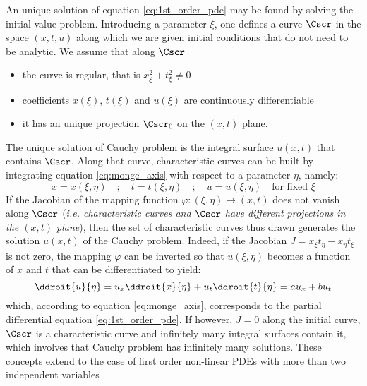 An unique solution of equation \eqref{eq:1st_order_pde} may be found by solving the initial value problem. Introducing a parameter $\xi$, one defines a curve $\Cscr$ in the space $(x,t,u)$ along which we are given initial conditions that do not need to be analytic. We assume that along $\Cscr$
\begin{itemize}
\item the curve is regular, that is $x_\xi^2 + t_\xi^2 \neq 0$
\item coefficients $x(\xi)$, $t(\xi)$ and $u(\xi)$ are continuously differentiable
\item it has an unique projection $\Cscr_0$ on the $(x,t)$ plane.
\end{itemize}
The unique solution of Cauchy problem is the integral surface $u(x,t)$ that contains $\Cscr$.
Along that curve, characteristic curves can be built by integrating equation \eqref{eq:monge_axis} with respect to a parameter $\eta$, namely:
\begin{equation}
  \label{eq:charac_on_C}
  x=x(\xi,\eta) \quad ; \quad t=t(\xi,\eta) \quad ; \quad u=u(\xi,\eta) \quad \text{for fixed } \xi
\end{equation}
If the Jacobian of the mapping function $\varphi:(\xi,\eta) \mapsto (x,t)$ does not vanish along $\Cscr$ (\textit{i.e. characteristic curves and $\Cscr$ have different projections in the $(x,t)$ plane}), then the set of characteristic curves thus drawn generates the solution $u(x,t)$ of the Cauchy problem. Indeed, if the Jacobian $J=x_\xi t_\eta - x_\eta t_\xi$ is not zero, the mapping $\varphi$ can be inverted so that $u(\xi,\eta)$ becomes a function of $x$ and $t$ that can be differentiated to yield:
\begin{equation*}
  \ddroit{u}{\eta}= u_x \ddroit{x}{\eta} + u_t \ddroit{t}{\eta} =  a u_x + b u_t
\end{equation*}
which, according to equation \eqref{eq:monge_axis}, corresponds to the partial differential equation \eqref{eq:1st_order_pde}. If however, $J=0$ along the initial curve, $\Cscr$ is a characteristic curve and infinitely many integral surfaces contain it, which involves that Cauchy problem has infinitely many solutions. These concepts extend to the case of first order non-linear PDEs with more than two independent variables \cite[Chapter~2]{Courant}.


